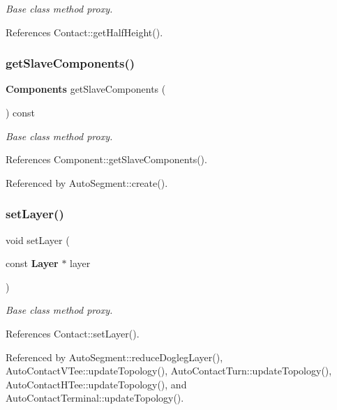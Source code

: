 {\itshape Base class method proxy.} 

References Contact\+::get\+Half\+Height().

\mbox{\label{classKatabatic_1_1AutoContact_ad59f45aaefd5acc8fb9795d4c0e49a7f}} 
\subsubsection{\texorpdfstring{get\+Slave\+Components()}{getSlaveComponents()}}
{\footnotesize\ttfamily \textbf{ Components} get\+Slave\+Components (\begin{DoxyParamCaption}{ }\end{DoxyParamCaption}) const\hspace{0.3cm}{\ttfamily [inline]}}

{\itshape Base class method proxy.} 

References Component\+::get\+Slave\+Components().



Referenced by Auto\+Segment\+::create().

\mbox{\label{classKatabatic_1_1AutoContact_aad4271c35e0162c8a4d034dca07f5a4b}} 
\subsubsection{\texorpdfstring{set\+Layer()}{setLayer()}}
{\footnotesize\ttfamily void set\+Layer (\begin{DoxyParamCaption}\item[{const \textbf{ Layer} $\ast$}]{layer }\end{DoxyParamCaption})\hspace{0.3cm}{\ttfamily [inline]}}

{\itshape Base class method proxy.} 

References Contact\+::set\+Layer().



Referenced by Auto\+Segment\+::reduce\+Dogleg\+Layer(), Auto\+Contact\+V\+Tee\+::update\+Topology(), Auto\+Contact\+Turn\+::update\+Topology(), Auto\+Contact\+H\+Tee\+::update\+Topology(), and Auto\+Contact\+Terminal\+::update\+Topology().

